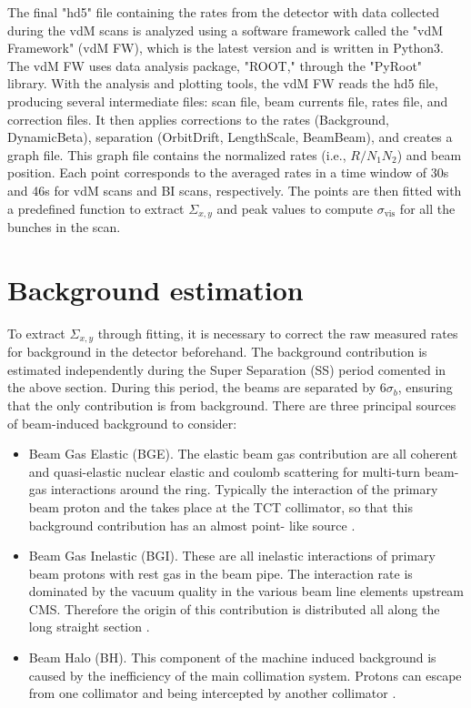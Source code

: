 The final "hd5" file containing the rates from the detector with data collected during the vdM scans is analyzed using a software framework called the "vdM Framework" (vdM FW), which is the latest version and is written in Python3. The vdM FW uses data analysis package, "ROOT," through the "PyRoot" library. With the analysis and plotting tools, the vdM FW reads the hd5 file, producing several intermediate files: scan file, beam currents file, rates file, and correction files. It then applies corrections to the rates (Background, DynamicBeta), separation (OrbitDrift, LengthScale, BeamBeam), and creates a graph file. This graph file contains the normalized rates (i.e., $R/N_{1}N_{2}$) and beam position. Each point corresponds to the averaged rates in a time window of 30s and 46s for vdM scans and BI scans, respectively. The points are then fitted with a predefined function to extract $\Sigma_{x,y}$ and peak values to compute $\sigma_{\text{vis}}$ for all the bunches in the scan.

\section{Background estimation}

To extract $\Sigma_{x,y}$ through fitting, it is necessary to correct the raw measured rates for background in the detector beforehand. The background contribution is estimated independently during the Super Separation (SS) period comented in the above section. During this period, the beams are separated by $6\sigma_{b}$, ensuring that the only contribution is from background. There are three principal sources of beam-induced background to consider:

\begin{itemize}

\item Beam Gas Elastic (BGE). The elastic beam gas contribution are all coherent and quasi-elastic nuclear elastic and coulomb scattering for multi-turn beam-gas interactions around the ring. Typically the interaction of the primary beam proton and the takes place at the TCT collimator, so that this background contribution has an almost point- like source \cite{bkg_source}.

\item Beam Gas Inelastic (BGI). These are all inelastic interactions of primary beam protons with rest gas in the beam pipe. The interaction rate is dominated by the vacuum quality in the various beam line elements upstream CMS. Therefore the origin of this contribution is distributed all along the long straight section \cite{bkg_source}.

\item Beam Halo (BH). This component of the machine induced background is caused by the inefficiency of the main collimation system. Protons can escape from one collimator and being intercepted by another collimator \cite{bkg_source}.
\end{itemize}

